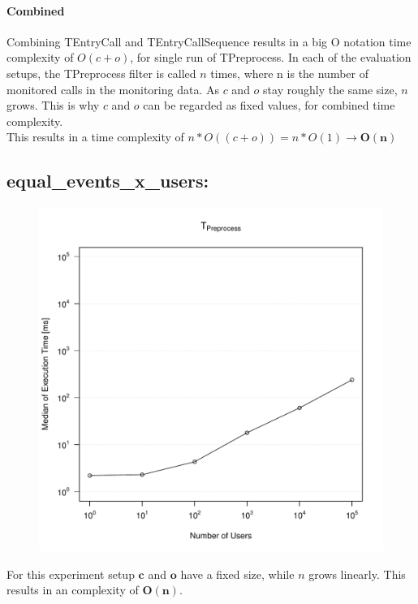 \documentclass[10pt,a4paper]{article}
\begin{document}
	\paragraph{Combined}
	Combining TEntryCall and TEntryCallSequence results in a big O notation time complexity of $O(c + o)$, for single run of TPreprocess. In each of the evaluation setups, the TPreprocess filter is called $n$ times, where n is the number of monitored calls in the monitoring data. As $c$ and $o$ stay roughly the same size, $n$ grows. This is why $c$ and $o$ can be regarded as fixed values, for combined time complexity.\\
	This results in a time complexity of $n * O((c + o)) = n * O(1) \rightarrow \mathbf{O(n)}$
	
	\subsection{equal\_events\_x\_users:}
	\begin{figure}[H]
		\centering
		\includegraphics[scale=0.7]{graphics/TPreprocess_median_equal_events.pdf}
	\end{figure}
	For this experiment setup $\mathbf{c}$ and $\mathbf{o}$ have a fixed size, while $n$ grows linearly. This results in an complexity of $\mathbf{O(n)}$.
	
\end{document}
